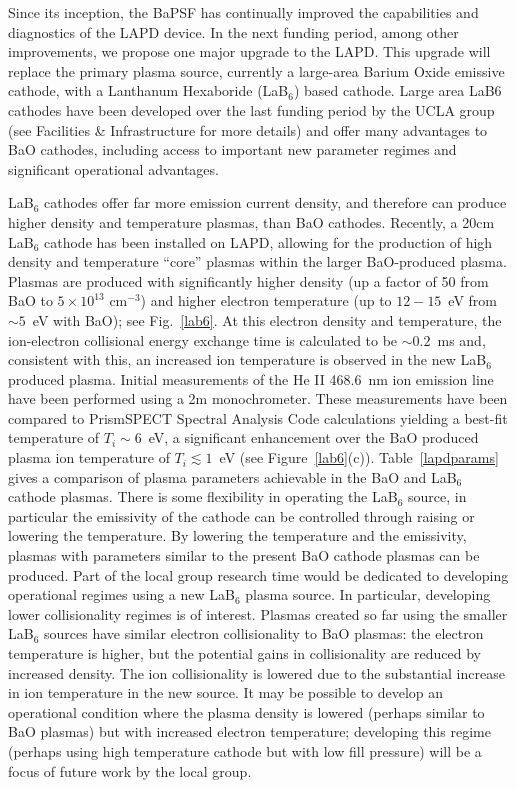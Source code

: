 \documentclass[11pt]{article}
\begin{document}
Since its inception, the BaPSF has continually improved the capabilities
and diagnostics of the LAPD device. In the next funding period, among
other improvements, we propose one major upgrade to the LAPD. This
upgrade will replace the primary plasma source, currently a large-area
Barium Oxide emissive cathode, with a Lanthanum Hexaboride (LaB$_6$) based
cathode. Large area LaB6 cathodes have been developed over the last
funding period by the UCLA group (see Facilities \& Infrastructure for more details) and
offer many advantages to BaO cathodes, including access to important new
parameter regimes and significant operational advantages.

LaB$_6$ cathodes offer far more emission current density, and
therefore can produce higher density and temperature plasmas, than BaO cathodes.
Recently, a 20cm LaB$_6$ cathode has been installed on LAPD, allowing for the production of high density and temperature
``core'' plasmas within the larger BaO-produced plasma. Plasmas are
produced with significantly higher density (up a factor of 50 from BaO
to $5\times 10^{13}$ cm$^{-3}$) and higher electron temperature (up to
$12-15$~eV from $\sim 5$~eV with BaO); see Fig.~\ref{lab6}. At this
electron density and temperature, the ion-electron collisional energy
exchange time is calculated to be $\sim 0.2$~ms and, consistent with
this, an increased ion temperature is observed in the new LaB$_6$
produced plasma. Initial measurements of the He II 468.6~nm
ion emission line have been performed using a 2m monochrometer. These
measurements have been compared to PrismSPECT Spectral Analysis Code
calculations yielding a best-fit temperature of $T_i \sim 6$~eV, a
significant enhancement over the BaO produced plasma ion temperature
of $T_i \lesssim 1$~eV (see Figure~\ref{lab6}(c)).
Table~\ref{lapdparams} gives a comparison of plasma parameters
achievable in the BaO and LaB$_6$ cathode plasmas.  There is some
flexibility in operating the LaB$_6$ source, in particular the
emissivity of the cathode can be controlled through raising or
lowering the temperature.  By lowering the temperature and the
emissivity, plasmas with parameters similar to the present BaO cathode plasmas can
be produced. Part of the local group research time would be dedicated
to developing operational regimes using a new LaB$_6$ plasma source. In
particular, developing lower collisionality regimes is of interest.
Plasmas created so far using the smaller LaB$_6$ sources have similar
electron collisionality to BaO plasmas: the electron temperature is
higher, but the potential gains in collisionality are reduced by increased
density.  The ion collisionality is lowered due to the substantial
increase in ion temperature in the new source.  It may be possible to
develop an operational condition where the plasma density is lowered
(perhaps similar to BaO plasmas) but with increased electron
temperature; developing this regime (perhaps using high temperature
cathode but with low fill pressure) will be a focus of future work by
the local group.  
\end{document}
